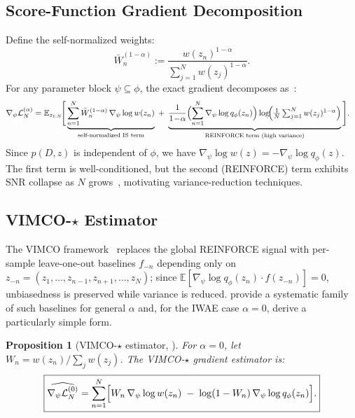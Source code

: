 \documentclass{article}
\newtheorem{proposition}[theorem]{Proposition}
\theoremstyle{definition}
\theoremstyle{remark}
\newcommand{\E}{\mathbb{E}}
\providecommand{\coloneqq}{:=}
\begin{document}
\subsection{Score-Function Gradient Decomposition}
\label{sec:sf_grad}
Define the self-normalized weights:
\begin{equation}
\bar{W}_n^{(1-\alpha)}
\coloneqq
\frac{w(z_n)^{1-\alpha}}{\sum_{j=1}^N w(z_j)^{1-\alpha}}.
\label{eq:snw}
\end{equation}
For any parameter block $\psi\subseteq\phi$, the exact gradient
decomposes as~\citep{daudel2026importance}:
\begin{align}
\nabla_\psi\mathcal{L}^{(\alpha)}_N
&= \E_{z_{1:N}}\!\Bigg[
\underbrace{%
  \sum_{n=1}^N \bar{W}_n^{(1-\alpha)}\,\nabla_\psi\log w(z_n)
}_{\text{self-normalized IS term}}
\;+\;
\underbrace{%
  \frac{1}{1\!-\!\alpha}
  \Bigl(\sum_{n=1}^N\nabla_\psi\log q_\phi(z_n)\Bigr)
  \log\!\Bigl(\tfrac{1}{N}\textstyle\sum_{j=1}^N w(z_j)^{1-\alpha}\Bigr)
}_{\text{REINFORCE term (high variance)}}
\Bigg].
\label{eq:reinforce_grad}
\end{align}
Since $p(D,z)$ is independent of $\phi$, we have
$\nabla_\psi\log w(z)=-\nabla_\psi\log q_\phi(z)$.
The first term is well-conditioned, but the second
(REINFORCE) term exhibits SNR collapse as $N$
grows~\citep{daudel2026importance,mnih2016vimco}, motivating
variance-reduction techniques.

\subsection{VIMCO-$\star$ Estimator}
\label{sec:vimco_star}

The VIMCO framework~\citep{mnih2016vimco} replaces the global REINFORCE
signal with per-sample leave-one-out baselines $f_{-n}$ depending only on
$z_{-n}=(z_1,\dots,z_{n-1},z_{n+1},\dots,z_N)$; since
$\E[\nabla_\psi\log q_\phi(z_n)\cdot f(z_{-n})]=0$, unbiasedness is
preserved while variance is reduced.
\citet{daudel2026importance} provide a systematic family of such
baselines for general $\alpha$ and, for the IWAE case $\alpha=0$,
derive a particularly simple form.

\begin{proposition}[VIMCO-$\star$ estimator, {\citet[Eq.~15]{daudel2026importance}}]
\label{prop:vimco_star}
For $\alpha=0$, let $W_n=w(z_n)/\sum_j w(z_j)$.
The VIMCO-$\star$ gradient estimator is:
\begin{equation}
\boxed{%
\widehat{\nabla_\psi\mathcal{L}^{(0)}_N}
= \sum_{n=1}^N \Bigl[
W_n\,\nabla_\psi\log w(z_n)
\;-\;
\log(1-W_n)\,\nabla_\psi\log q_\phi(z_n)
\Bigr].
}
\label{eq:vimco_star}
\end{equation}
\end{proposition}
\end{document}
